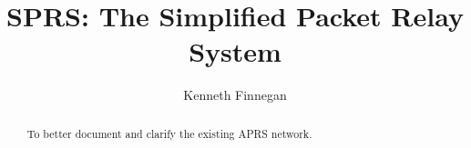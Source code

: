 \documentclass{report}
\begin{document}
\title{SPRS: The Simplified Packet Relay System}
\author{Kenneth Finnegan}
\maketitle

\begin{abstract}
To better document and clarify the existing APRS network.
\end{abstract}

\tableofcontents






\end{document}

